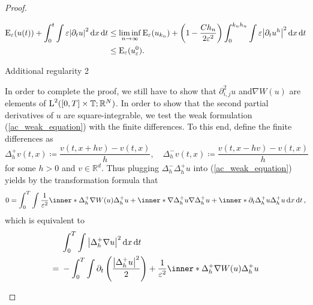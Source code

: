 \begin{proof}
\begin{description}[wide=0pt]
	\begin{align*}
		\operatorname{E}_{ \varepsilon } ( u ( t ) )
		+
		\int_{ 0 }^{ t }
			\int
				\varepsilon
				\abs{ \partial_{ t } u }^{ 2 }
			\dd{ x }
		\dd{ t }
		& \leq
		\liminf_{ n \to \infty }
			\operatorname{E}_{ \varepsilon } ( u_{ k_{ n } } )
			+
			\left( 1 - \frac{ C h_{ n } }{ 2 \varepsilon^{ 2 } } \right)
			\int_{ 0 }^{ k_{ n } h_{ n } }
				\int
					\varepsilon
					\abs{ \partial_{ t } u^{ h } }^{ 2 }
				\dd{ x }
			\dd{ t }
		\\
		& \leq
		\operatorname{E}_{ \varepsilon } ( u_{ \varepsilon }^{ 0 } ).
	\end{align*}

	\item[Step 8:] Additional regularity 2
	
	In order to complete the proof, we still have to show that $ \partial_{ i , j }^{ 2 } u$ and$ \nabla W ( u) $ are elements of $ \operatorname{L}^{ 2 } ( [ 0 , T ] \times \operatorname{\mathbb{T}} ; \mathbb{ R }^{ N } ) $.
	In order to show that the second partial derivatives of $ u $ are square-integrable, we test the weak formulation (\ref{ac_weak_equation}) with the finite differences. To this end, define the finite differences as
	\begin{equation*}
		\Delta_{ h }^{ + } v ( t , x ) \coloneqq \frac{ v ( t , x + h v ) - v ( t , x ) }{ h },
		\quad
		\Delta_{ h }^{ - } v ( t , x ) \coloneqq \frac{ v ( t , x - h v ) - v ( t , x ) }{ h }
	\end{equation*}
	for some $ h > 0 $ and $ v \in \mathbb{ R }^{ d } $. Thus plugging $ \Delta_{ h }^{ - } \Delta_{ h }^{ + } u $ into (\ref{ac_weak_equation}) yields by the transformation formula that
	\begin{equation*}
		0
		=
		\int_{ 0 }^{ T }
			\int
				\frac{ 1 }{ \varepsilon^{ 2 } }
				\inner*{ \Delta_{ h }^{ + } \nabla W ( u ) }{ \Delta_{ h }^{ + } u }
				+
				\inner*{ \nabla \Delta_{ h }^{ + } u }{ \nabla \Delta_{ h }^{ + } u }
				+
				\inner*{ \partial_{ t } \Delta_{ h }^{ + } u }{ \Delta_{ h }^{ + } u }
			\dd{ x }
		\dd{ t },
	\end{equation*}
	which is equivalent to
	\begin{align*}
		& \int_{ 0 }^{ T }
			\int
				\abs{ \Delta_{ h }^{ + } \nabla u }^{ 2 }
			\dd{ x }
		\dd{ t }
		\\
		={} &
		-
		\int_{ 0 }^{ T }
			\int
				\partial_{ t } \left( \frac{ \abs{ \Delta_{ h }^{ + } u }^{ 2 } }{ 2 } \right)
				+
				\frac{ 1 }{ \varepsilon^{ 2 } }
				\inner*{ \Delta_{ h }^{ + } \nabla W ( u ) }{ \Delta_{ h }^{ + } u }

\end{align*}
\end{description}
\end{proof}
